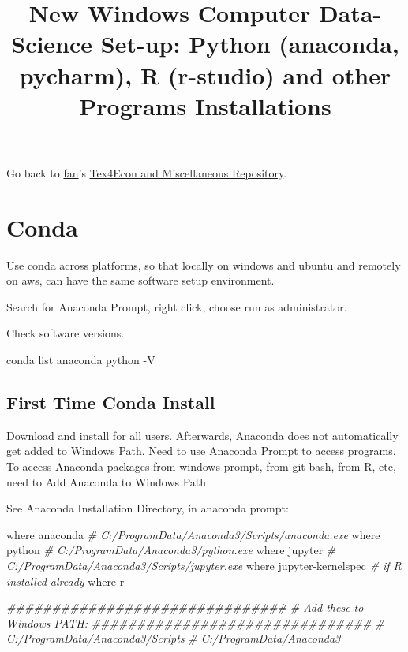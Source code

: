 \documentclass[
]{article}
\title{New Windows Computer Data-Science Set-up: Python (anaconda, pycharm), R
(r-studio) and other Programs Installations}
\author{}
\date{\vspace{-2.5em}}
\newenvironment{Shaded}{\begin{snugshade}}{\end{snugshade}}
\newcommand{\CommentTok}[1]{\textcolor[rgb]{0.56,0.35,0.01}{\textit{#1}}}
\newcommand{\ExtensionTok}[1]{#1}
\newcommand{\NormalTok}[1]{#1}
\begin{document}
\maketitle

Go back to \href{http://fanwangecon.github.io/}{fan}'s
\href{http://fanwangecon.github.io/Tex4Econ/}{Tex4Econ and Miscellaneous
Repository}.

\hypertarget{conda}{%
\section{Conda}\label{conda}}

Use conda across platforms, so that locally on windows and ubuntu and
remotely on aws, can have the same software setup environment.

Search for Anaconda Prompt, right click, choose run as administrator.

Check software versions.

\begin{Shaded}
\begin{Highlighting}[]
\ExtensionTok{conda}\NormalTok{ list anaconda}
\ExtensionTok{python}\NormalTok{ -V}
\end{Highlighting}
\end{Shaded}

\hypertarget{first-time-conda-install}{%
\subsection{First Time Conda Install}\label{first-time-conda-install}}

Download and install for all users. Afterwards, Anaconda does not
automatically get added to Windows Path. Need to use Anaconda Prompt to
access programs. To access Anaconda packages from windows prompt, from
git bash, from R, etc, need to Add Anaconda to Windows Path

See Anaconda Installation Directory, in anaconda prompt:

\begin{Shaded}
\begin{Highlighting}[]
\ExtensionTok{where}\NormalTok{ anaconda}
\CommentTok{# C:/ProgramData/Anaconda3/Scripts/anaconda.exe}
\ExtensionTok{where}\NormalTok{ python}
\CommentTok{# C:/ProgramData/Anaconda3/python.exe}
\ExtensionTok{where}\NormalTok{ jupyter}
\CommentTok{# C:/ProgramData/Anaconda3/Scripts/jupyter.exe}
\ExtensionTok{where}\NormalTok{ jupyter-kernelspec}
\CommentTok{# if R installed already}
\ExtensionTok{where}\NormalTok{ r}

\CommentTok{###############################}
\CommentTok{# Add these to Windows PATH:}
\CommentTok{###############################}
\CommentTok{# C:/ProgramData/Anaconda3/Scripts}
\CommentTok{# C:/ProgramData/Anaconda3}
\end{Highlighting}
\end{Shaded}
\end{document}
